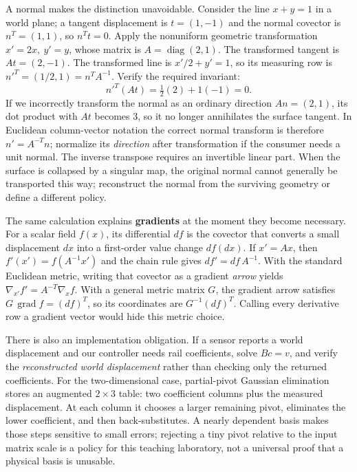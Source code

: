 A normal makes the distinction unavoidable. Consider the line \(x+y=1\) in a world plane; a tangent displacement is \(t=(1,-1)\) and the normal covector is \(n^T=(1,1)\), so \(n^Tt=0\). Apply the nonuniform geometric transformation \(x'=2x,\ y'=y\), whose matrix is \(A=\operatorname{diag}(2,1)\). The transformed tangent is \(At=(2,-1)\). The transformed line is \(x'/2+y'=1\), so its measuring row is \(n'^T=(1/2,1)=n^TA^{-1}\). Verify the required invariant: \[
n'^T(At)=\tfrac12(2)+1(-1)=0.
\] If we incorrectly transform the normal as an ordinary direction \(An=(2,1)\), its dot product with \(At\) becomes \(3\), so it no longer annihilates the surface tangent. In Euclidean column-vector notation the correct normal transform is therefore \(n'=A^{-T}n\); normalize its \emph{direction} after transformation if the consumer needs a unit normal. The inverse transpose requires an invertible linear part. When the surface is collapsed by a singular map, the original normal cannot generally be transported this way; reconstruct the normal from the surviving geometry or define a different policy.

The same calculation explains \textbf{gradients} at the moment they become necessary. For a scalar field \(f(x)\), its differential \(df\) is the covector that converts a small displacement \(dx\) into a first-order value change \(df(dx)\). If \(x'=Ax\), then \(f'(x')=f(A^{-1}x')\) and the chain rule gives \(df'=df\,A^{-1}\). With the standard Euclidean metric, writing that covector as a gradient \emph{arrow} yields \(\nabla_{x'}f'=A^{-T}\nabla_x f\). With a general metric matrix \(G\), the gradient arrow satisfies \(G\,\operatorname{grad}f=(df)^T\), so its coordinates are \(G^{-1}(df)^T\). Calling every derivative row a gradient vector would hide this metric choice.

There is also an implementation obligation. If a sensor reports a world displacement and our controller needs rail coefficients, solve \(Bc=v\), and verify the \emph{reconstructed world displacement} rather than checking only the returned coefficients. For the two-dimensional case, partial-pivot Gaussian elimination stores an augmented \(2\times3\) table: two coefficient columns plus the measured displacement. At each column it chooses a larger remaining pivot, eliminates the lower coefficient, and then back-substitutes. A nearly dependent basis makes those steps sensitive to small errors; rejecting a tiny pivot relative to the input matrix scale is a policy for this teaching laboratory, not a universal proof that a physical basis is unusable.

